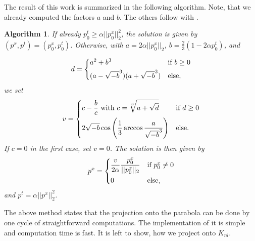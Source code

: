 \documentclass{scrreprt}
\newtheorem{algorithm}[theorem]{Algorithm}
\begin{document}
            The result of this work is summarized in the following algorithm. Note, that we already computed the factors $a$ and $b$. The others follow with \cite{kelvey-ajp}.

                \begin{algorithm}
                    \label{alg:projection_on_parabola}
                    If already $p_{0}^{t} \ge \alpha ||p_{0}^{x}||_{2}^{2}$, the solution is given by $(p^{x}, p^{t}) = (p_{0}^{x}, p_{0}^{t})$. Otherwise, with $a = 2 \alpha ||p_{0}^{x}||_{2}$, $b = \frac{2}{3} (1 - 2 \alpha p_{0}^{t})$, and

                        \[
                            d =
                                \begin{dcases*}
                                    a^{2} + b^{3} & \textnormal{if $b \ge 0$}\\
                                    (a - \sqrt{-b}^{3})(a + \sqrt{-b}^{3}) & \textnormal{else,}
                                \end{dcases*}
                        \]
                    we set
                        \[
                            v =
                                \begin{dcases*}
                                    c - \frac{b}{c} \,\, \textnormal{with} \,\, c = \sqrt[3]{a + \sqrt{d}} & \textnormal{if $d \ge 0$}\\
                                    2 \sqrt{-b} \cos \left( \frac{1}{3} \arccos \frac{a}{\sqrt{-b}^{3}} \right) & \textnormal{else}.
                                \end{dcases*}
                        \]
                    If $c = 0$ in the first case, set $v = 0$. The solution is then given by
                        \[
                            p^{x} =
                                \begin{dcases*}
                                    \frac{v}{2\alpha} \frac{p_{0}^{x}}{||p_{0}^{x}||_{2}} & \textnormal{if $p_{0}^{x} \ne 0$}\\
                                    0 & \textnormal{else,}
                                \end{dcases*}
                        \]
                    and $p^{t} = \alpha ||p^{x}||_{2}^{2}$.
                \end{algorithm}

            The above method states that the projection onto the parabola can be done by one cycle of straightforward computations. The implementation of it is simple and computation time is fast. It is left to show, how we project onto $K_{nl}$.
\end{document}
